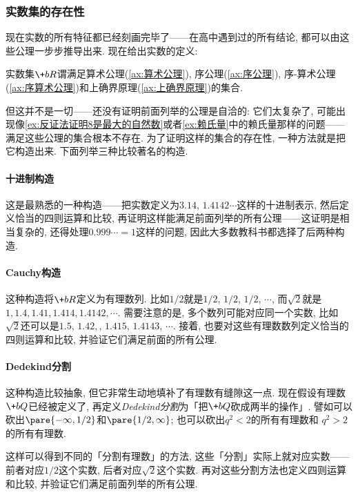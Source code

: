 \documentclass[hidelinks]{ctexart}
\begin{document}
\subsubsection{实数集的存在性} %
\label{ssub:实数集的存在性}
现在实数的所有特征都已经刻画完毕了——在高中遇到过的所有结论, 都可以由这些公理一步步推导出来. 现在给出实数的定义:
\begin{finale}
    \begin{definition}[实数]
        \label{def:实数的定义}
        实数集$\+bR$谓满足算术公理(\cref{ax:算术公理}), 序公理(\cref{ax:序公理}), 序-算术公理(\cref{ax:序算术公理})和上确界原理(\cref{ax:上确界原理})的集合.
    \end{definition}
\end{finale}
但这并不是一切——还没有证明前面列举的公理是自洽的: 它们太复杂了, 可能出现像\cref{ex:反证法证明8是最大的自然数}或者\cref{ex:赖氏量}中的赖氏量那样的问题——满足这些公理的集合根本不存在. 为了证明这样的集合的存在性, 一种方法就是把它构造出来. 下面列举三种比较著名的构造.
\begin{sample}
\paragraph{十进制构造}
这是最熟悉的一种构造——把实数定义为$3.14$, $1.4142\cdots$这样的十进制表示, 然后定义恰当的四则运算和比较, 再证明这样能满足前面列举的所有公理——这证明是相当复杂的, 还得处理$0.999\cdots=1$这样的问题, 因此大多数教科书都选择了后两种构造.
\paragraph{Cauchy构造}
这种构造将$\+bR$定义为有理数列. 比如$1/2$就是$1/2$, $1/2$, $1/2$, $\cdots$, 而$\sqrt{2}$就是$1, 1.4, 1.41, 1.414, 1.4142, \cdots$. 需要注意的是, 多个数列可能对应同一个实数, 比如$\sqrt{2}$还可以是$1.5$, $1.42,$, $1.415$, $1.4143$, $\cdots$. 接着, 也要对这些有理数数列定义恰当的四则运算和比较, 并验证它们满足前面的所有公理.
\paragraph{Dedekind分割}
这种构造比较抽象, 但它非常生动地填补了有理数有缝隙这一点. 现在假设有理数$\+bQ$已经被定义了, 再定义\emph{Dedekind分割}为「把$\+bQ$砍成两半的操作」. 譬如可以砍出$\pare{-\infty, 1/2}$和$\pare{1/2,\infty}$; 也可以砍出$q^2<2$的所有有理数和 $q^2>2$的所有有理数. 
\par
这样可以得到不同的「分割有理数」的方法, 这些「分割」实际上就对应实数——前者对应$1/2$这个实数, 后者对应$\sqrt{2}$这个实数. 再对这些分割方法也定义四则运算和比较, 并验证它们满足前面列举的所有公理.
\end{sample}
\end{document}
